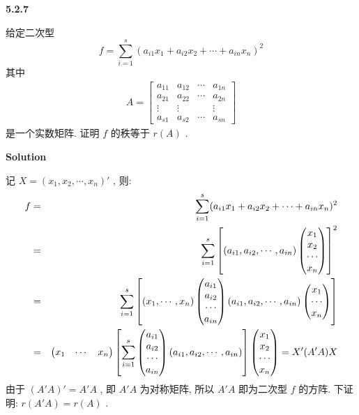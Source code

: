 \documentclass[11pt,a4paper,openany,oneside]{book}
\newcommand\Solution{\noindent\textbf{\textsf{Solution}}\par\medskip}
\begin{document}
\begin{myexample}
	\textbf{5.2.7}

给定二次型
 $$  f = \sum\limits_{i=1}^s (a_{i1}x_1 + a_{i2}x_2 + \cdots + a_{in}x_n)^2  $$ 
其中
\begin{gather*}
A = 
\begin{bmatrix}
a_{11}  &  a_{12}  &  \cdots  &  a_{1n}  \\
a_{21}  &  a_{22}  &  \cdots  &  a_{2n}  \\
\vdots  &  \vdots  &          &  \vdots  \\
a_{s1}  &  a_{s2}  &  \cdots  &  a_{sn}
\end{bmatrix}
\end{gather*}
是一个实数矩阵. 证明 $ f $ 的秩等于 $ r(A) $ .  \\

\end{myexample}
\Solution

记 $ X = (x_1, x_2, \cdots, x_n)' $ , 则:
\begin{eqnarray}
f &=& \sum\limits_{i=1}^s(a_{i1}x_1 + a_{i2}x_2 + \cdots + a_{in}x_n)^2  \notag\\
&=& \sum\limits_{i=1}^s \left[(a_{i1}, a_{i2}, \cdots , a_{in}) 
\begin{pmatrix}
x_1 \\  x_2 \\ \cdots \\ x_n \\
\end{pmatrix} \right]^2  \notag\\
&=& \sum\limits_{i=1}^s \left [(x_1, \cdots, x_n)
\begin{pmatrix}
a_{i1} \\ a_{i2} \\ \cdots \\ a_{in} 
\end{pmatrix}
(a_{i1}, a_{i2}, \cdots , a_{in})
\begin{pmatrix}
x_1 \\ \cdots \\  x_n  
\end{pmatrix} \right] \notag\\
&=& 
\begin{pmatrix}
x_1 &  \cdots  &  x_n
\end{pmatrix}
\left[\sum\limits_{i=1}^s
\begin{pmatrix}
a_{i1} \\ a_{i2} \\ \cdots \\ a_{in} 
\end{pmatrix}
(a_{i1}, a_{i2}, \cdots , a_{in})
\right]
\begin{pmatrix}
x_1 \\  x_2 \\ \cdots \\ x_n \\
\end{pmatrix} = X'(A'A)X \notag\\
\end{eqnarray}
由于 $ (A'A)' = A'A $ , 即 $ A'A $ 为对称矩阵, 所以 $ A'A $ 即为二次型 $ f $ 的方阵. 下证明: $ r(A'A) = r(A) $ .
\end{document}
